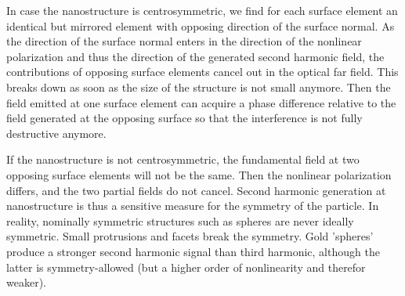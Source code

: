 In case the nanostructure is centrosymmetric, we find for  each surface element  an identical but mirrored element with opposing direction of the surface normal. As the direction of the surface normal enters in the direction of the nonlinear polarization and thus the direction of the generated second harmonic field, the contributions of opposing surface elements cancel out in the optical far field. This breaks down as soon as the size of the structure is not small anymore. Then the field emitted at one surface element can acquire a phase difference relative to the field generated at the opposing surface so that the interference is not fully destructive anymore.

If the nanostructure is not centrosymmetric, the fundamental field at two opposing surface elements will not be the same. Then the nonlinear polarization differs, and the two partial fields do not cancel. Second harmonic generation at nanostructure is thus a sensitive measure for the symmetry of the particle. In reality, nominally symmetric structures such as spheres are never ideally symmetric. Small protrusions and facets break the symmetry. Gold 'spheres' produce a stronger second harmonic signal than third harmonic, although the latter is symmetry-allowed (but a higher order of nonlinearity and therefor weaker).








\printbibliography[segment=\therefsegment,heading=subbibliography]
